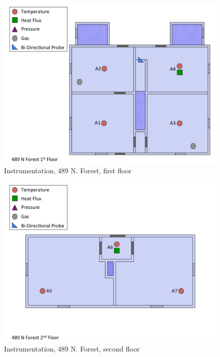 \documentclass[12pt,oneside]{book}
\begin{document}
\begin{figure}[!ht]
\includegraphics[width=6.5in]{../Drawings/Instrumentation/489_N_Forest_1st_Floor}
\caption{Instrumentation, 489 N. Forest, first floor}
\label{fig:Instrumentation_489_N_Forest_1st_Floor}
\end{figure}

\begin{figure}[!ht]
\includegraphics[width=6.5in]{../Drawings/Instrumentation/489_N_Forest_2nd_Floor}
\caption{Instrumentation, 489 N. Forest, second floor}
\label{fig:Instrumentation_489_N_Forest_2nd_Floor}
\end{figure}
\end{document}
